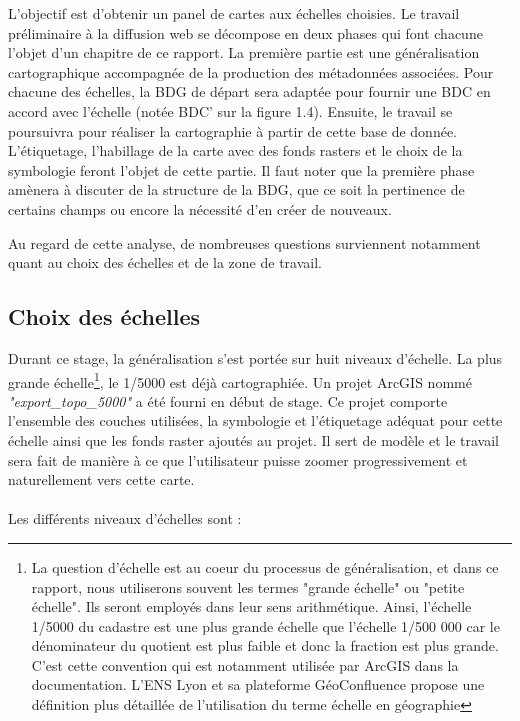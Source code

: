 L'objectif est d'obtenir un panel de cartes aux échelles choisies. Le travail préliminaire à la diffusion web se décompose en deux phases qui font chacune l'objet d'un chapitre de ce rapport. La première partie est une généralisation cartographique accompagnée de la production des métadonnées associées. Pour chacune des échelles, la BDG de départ sera adaptée pour fournir une BDC en accord avec l'échelle (notée BDC' sur la figure 1.4). Ensuite, le travail se poursuivra pour réaliser la cartographie à partir de cette base de donnée. L'étiquetage, l'habillage de la carte avec des fonds rasters et le choix de la symbologie feront l'objet de cette partie. Il faut noter que la première phase amènera à discuter de la structure de la BDG, que ce soit la pertinence de certains champs ou encore la nécessité d'en créer de nouveaux.



Au regard de cette analyse, de nombreuses questions surviennent notamment quant au choix des échelles et de la zone de travail.

\subsection{Choix des échelles}
Durant ce stage, la généralisation s'est portée sur huit niveaux d'échelle. La plus grande échelle\footnote{La question d'échelle est au coeur du processus de généralisation, et dans ce rapport, nous utiliserons souvent les termes "grande échelle" ou "petite échelle". Ils  seront employés dans leur sens arithmétique. Ainsi, l'échelle 1/5000 du cadastre est une plus grande échelle que l'échelle 1/500 000 car le dénominateur du quotient est plus faible et donc la fraction est plus grande. C'est cette convention qui est notamment utilisée par ArcGIS dans la documentation. L'ENS Lyon et sa plateforme GéoConfluence propose une définition plus détaillée de l'utilisation du terme échelle en géographie }, le 1/5000 est déjà cartographiée. Un projet ArcGIS nommé \textit{"export\_topo\_5000"} a été fourni en début de stage. Ce projet comporte l'ensemble des couches utilisées, la symbologie et l'étiquetage adéquat pour cette échelle ainsi que les fonds raster ajoutés au projet. Il sert de modèle et le travail sera fait de manière à ce que l'utilisateur puisse zoomer progressivement et naturellement vers cette carte.\\ \\ Les différents niveaux d'échelles sont :

